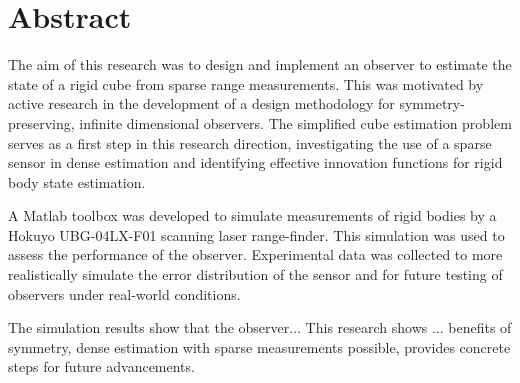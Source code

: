\chapter*{Abstract}
\vspace{-1em}

The aim of this research was to design and implement an observer to estimate the state of a rigid cube from sparse range measurements. This was motivated by active research in the development of a design methodology for symmetry-preserving, infinite dimensional observers. The simplified cube estimation problem serves as a first step in this research direction, investigating the use of a sparse sensor in dense estimation and identifying effective innovation functions for rigid body state estimation. 

A Matlab toolbox was developed to simulate measurements of rigid bodies by a Hokuyo UBG-04LX-F01 scanning laser range-finder. This simulation was used to assess the performance of the observer. Experimental data was collected to more realistically simulate the error distribution of the sensor and for future testing of observers under real-world conditions. 

The simulation results show that the observer...
This research shows ... benefits of symmetry, dense estimation with sparse measurements possible, provides concrete steps for future advancements.


